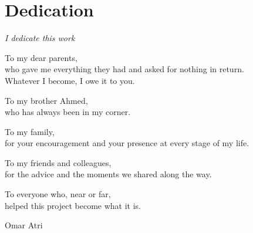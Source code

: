 \chapter*{Dedication}
\thispagestyle{empty}

\newfontfamily{}

\begin{flushleft}
{\dedicationfont\itshape\large
I dedicate this work

\vspace{0.3cm}
To my dear parents,\\
who gave me everything they had and asked for nothing in return.\\
Whatever I become, I owe it to you.

\vspace{0.3cm}
To my brother Ahmed,\\
who has always been in my corner.

\vspace{0.3cm}
To my family,\\
for your encouragement and your presence at every stage of my life.

\vspace{0.3cm}
To my friends and colleagues,\\
for the advice and the moments we shared along the way.

\vspace{0.3cm}
To everyone who, near or far,\\
helped this project become what it is.
}
\end{flushleft}

\vspace{1cm}
\begin{flushright}
{\dedicationfont\large Omar Atri}
\end{flushright}

\newpage
